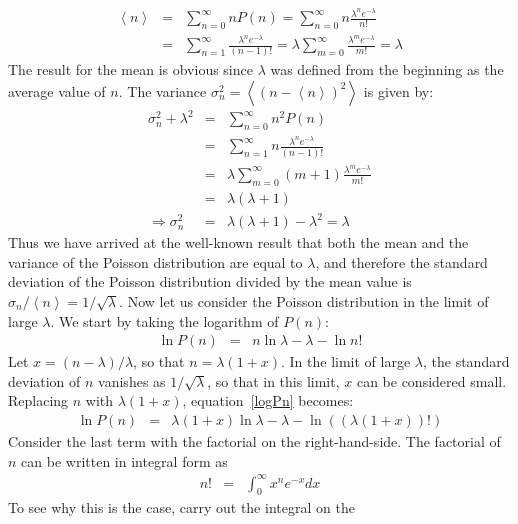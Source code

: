 \documentclass{revtex4}
\begin{document}
\begin{eqnarray}
  \left<n\right> &=& \sum_{n=0}^\infty n P(n) = \sum_{n=0}^\infty n
  \frac{\lambda^n e^{-\lambda}}{n!}  \nonumber \\
  &=& \sum_{n=1}^\infty \frac{\lambda^n e^{-\lambda}}{(n-1)!} =
  \lambda \sum_{m=0}^\infty \frac{\lambda^m e^{-\lambda}}{m!} = \lambda
\end{eqnarray}
The result for the mean is obvious since $\lambda$ was defined from
the beginning as the average value of $n$. The variance $\sigma_n^2 =
\left<\left(n-\left<n\right>\right)^2\right>$ is given by:
\begin{eqnarray}
  \sigma_n^2 + \lambda^2 &=& \sum_{n=0}^\infty n^2 P(n)  \nonumber \\
  &=& \sum_{n=1}^\infty n \frac{\lambda^n e^{-\lambda}}{(n-1)!}
  \nonumber \\
  &=& \lambda \sum_{m=0}^\infty (m+1) \frac{\lambda^m
    e^{-\lambda}}{m!} \nonumber \\
  &=& \lambda (\lambda + 1) \nonumber \\
  \Rightarrow \sigma_n^2 &=& \lambda(\lambda+1) - \lambda^2 = \lambda
\end{eqnarray}
Thus we have arrived at the well-known result that both the mean and the
variance of the Poisson distribution are equal to $\lambda$, and
therefore the standard deviation of the Poisson distribution divided
by the mean value is $\sigma_n/\left<n\right> = 1/\sqrt{\lambda}$. Now
let us consider the Poisson distribution in the limit of large
$\lambda$. We start by taking the logarithm of $P(n)$:
\begin{eqnarray}
  \ln{P(n)} &=& n \ln \lambda - \lambda - \ln n! \label{logPn}
\end{eqnarray}
Let $x = (n - \lambda)/\lambda$, so that $n = \lambda(1 + x)$. In the
limit of large $\lambda$, the standard deviation of $n$ vanishes as
$1/\sqrt{\lambda}$, so that in this limit, $x$ can be considered
small. Replacing $n$ with $\lambda(1+x)$, equation~\eqref{logPn} becomes:
\begin{eqnarray}
  \ln P(n) &=& \lambda(1+x) \ln \lambda - \lambda - \ln\left(
    (\lambda(1+x))! \right)
\end{eqnarray}
Consider the last term with the factorial on the right-hand-side. The
factorial of $n$ can be written in integral form as 
\begin{eqnarray}
  n! &=& \int_0^\infty x^n e^{-x} dx \label{nfactintegral}
\end{eqnarray}
To see why this is the case, carry out the integral on the
\end{document}
